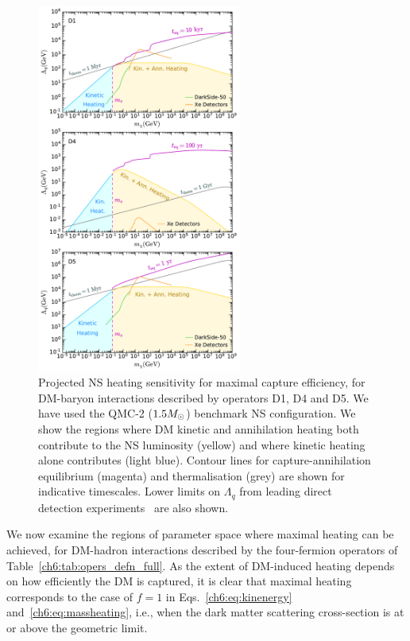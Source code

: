 \begin{figure}[t!bp]
    \centering
    \includegraphics[width=0.6\textwidth]{ann_heat_sensitivity_3ops.pdf}   
    \caption{
    Projected NS heating sensitivity for maximal capture efficiency, for DM-baryon interactions described by operators D1, D4 and D5.  We have used the QMC-2 ($1.5M_\odot$) benchmark NS configuration.
    We show the regions where DM kinetic and annihilation heating both contribute to the NS luminosity (yellow) and where kinetic heating alone contributes (light blue).
    Contour lines for capture-annihilation equilibrium (magenta) and thermalisation (grey) are shown for indicative timescales.    
     Lower limits on $\Lambda_q$ from leading  direct detection experiments~\cite{DarkSide:2022dhx_mar_SearchDarkMatterNucleon,XENON:2020gfr_mar_SearchCoherentElastic,PandaX-4T:2021bab_dec_DarkMatterSearch,LZ:2022lsv_jul_FirstDarkMatter} are also shown.  
    }
    \label{ch6:fig:NS_heating}
\end{figure}

We now examine the regions of parameter space where maximal heating can be achieved, for DM-hadron interactions described by the four-fermion operators of Table~\ref{ch6:tab:opers_defn_full}. As the extent of DM-induced heating depends on how efficiently the DM is captured, it is clear that maximal heating corresponds to the case of $f=1$ in Eqs.~\ref{ch6:eq:kinenergy} and~\ref{ch6:eq:massheating}, i.e., when the dark matter scattering cross-section is at or above the geometric limit. 


